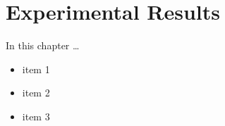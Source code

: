 \documentclass[../thesis.tex]{subfiles}
\begin{document}
\chapter{Experimental Results}
\label{ch:experiments}
In this chapter \ldots
\begin{itemize}
	\item item 1
	\item item 2
	\item item 3
\end{itemize}
\lipsum[18-20]
\end{document}

